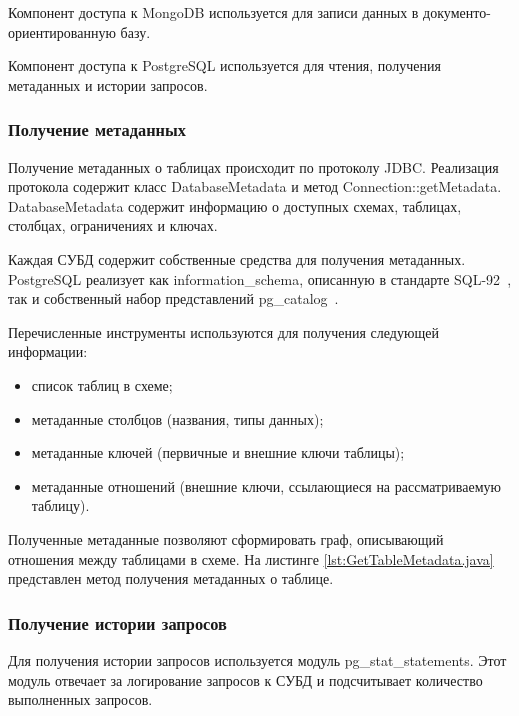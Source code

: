 Компонент доступа к MongoDB используется для записи данных в документо-ориентированную базу.

Компонент доступа к PostgreSQL используется для чтения, получения метаданных и истории запросов.

\subsubsection{Получение метаданных}
Получение метаданных о таблицах происходит по протоколу JDBC. 
Реализация протокола содержит класс \textmd{DatabaseMetadata} и метод \textmd{Connection::getMetadata}.
\textmd{DatabaseMetadata} содержит информацию о доступных схемах, таблицах, столбцах, ограничениях и ключах.

Каждая СУБД содержит собственные средства для получения метаданных. 
PostgreSQL реализует как \textmd{information\_schema}, описанную в стандарте SQL-92~\cite{sql-92},
так и собственный набор представлений \textmd{pg\_catalog}~\cite{pg-catalog}.

Перечисленные инструменты используются для получения следующей информации:
\begin{itemize}[label=---]
    \item список таблиц в схеме;
    \item метаданные столбцов (названия, типы данных);
    \item метаданные ключей (первичные и внешние ключи таблицы);
    \item метаданные отношений (внешние ключи, ссылающиеся на рассматриваемую таблицу).
\end{itemize}

Полученные метаданные позволяют сформировать граф, описывающий отношения между таблицами в схеме.
На листинге \ref{lst:GetTableMetadata.java} представлен метод получения метаданных о таблице.

\clearpage


\clearpage

\subsubsection{Получение истории запросов}

Для получения истории запросов используется модуль \textmd{pg\_stat\_statements}. 
Этот модуль отвечает за логирование запросов к СУБД и подсчитывает количество выполненных запросов.

